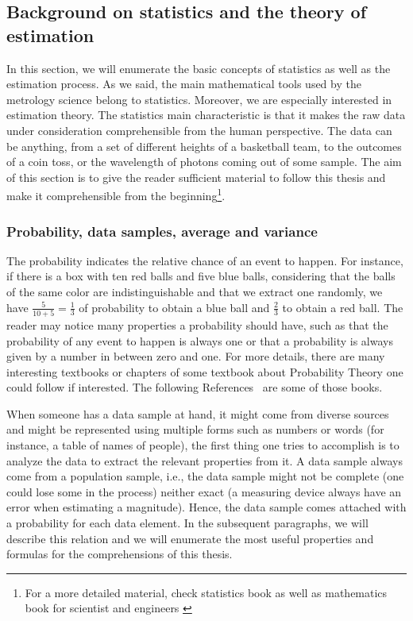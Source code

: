 \subsection{Background on statistics and the theory of estimation}

In this section, we will enumerate the basic concepts of statistics as well as the estimation process.
As we said, the main mathematical tools used by the metrology science belong to statistics.
Moreover, we are especially interested in estimation theory.
The statistics main characteristic is that it makes the raw data under consideration comprehensible from the human perspective.
The data can be anything, from a set of different heights of a basketball team, to the outcomes of a coin toss, or the wavelength of photons coming out of some sample.
The aim of this section is to give the reader sufficient material to follow this thesis and make it comprehensible from the beginning\footnote{
For a more detailed material, check statistics book as well as mathematics book for scientist and engineers \citep{Riley1998, BarlowXXXX}}.

\subsubsection{Probability, data samples, average and variance}

The probability indicates the relative chance of an event to happen.
For instance, if there is a box with ten red balls and five blue balls, considering that the balls of the same color are indistinguishable and that we extract one randomly, we have $\frac{5}{10+5}=\frac{1}{3}$ of probability to obtain a blue ball and $\frac{2}{3}$ to obtain a red ball.
The reader may notice many properties a probability should have, such as that the probability of any event to happen is always one or that a probability is always given by a number in between zero and one.
For more details, there are many interesting textbooks or chapters of some textbook about Probability Theory one could follow if interested.
The following References~\citep{Riley1998, BarlowXXXX} are some of those books.

When someone has a data sample at hand, it might come from diverse sources and might be represented using multiple forms such as numbers or words (for instance, a table of names of people), the first thing one tries to accomplish is to analyze the data to extract the relevant properties from it.
A data sample always come from a population sample, i.e., the data sample might not be complete (one could lose some in the process) neither exact (a measuring device always have an error when estimating a magnitude).
Hence, the data sample comes attached with a probability for each data element.
In the subsequent paragraphs, we will describe this relation and we will enumerate the most useful properties and formulas for the comprehensions of this thesis.

